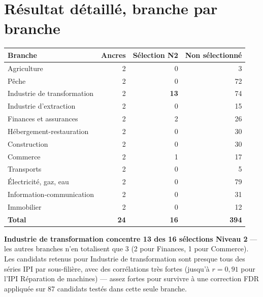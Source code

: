 \documentclass[11pt,a4paper]{article}
\begin{document}
\section{Résultat détaillé, branche par branche}

\begin{fichebox}
\begin{center}
\small
\begin{tabular}{lrrr}
\toprule
\textbf{Branche} & \textbf{Ancres} & \textbf{Sélection N2} & \textbf{Non sélectionné} \\
\midrule
Agriculture & 2 & 0 & 3 \\
Pêche & 2 & 0 & 72 \\
Industrie de transformation & 2 & \textbf{13} & 74 \\
Industrie d'extraction & 2 & 0 & 15 \\
Finances et assurances & 2 & 2 & 26 \\
Hébergement-restauration & 2 & 0 & 30 \\
Construction & 2 & 0 & 30 \\
Commerce & 2 & 1 & 17 \\
Transports & 2 & 0 & 5 \\
Électricité, gaz, eau & 2 & 0 & 79 \\
Information-communication & 2 & 0 & 31 \\
Immobilier & 2 & 0 & 12 \\
\midrule
\textbf{Total} & \textbf{24} & \textbf{16} & \textbf{394} \\
\bottomrule
\end{tabular}
\end{center}
\end{fichebox}

\begin{alertebox}
\textbf{Industrie de transformation concentre 13 des 16 sélections Niveau 2} --- les autres branches n'en totalisent que 3 (2 pour Finances, 1 pour Commerce). Les candidats retenus pour Industrie de transformation sont presque tous des séries IPI par sous-filière, avec des corrélations très fortes (jusqu'à $r=0{,}91$ pour l'IPI Réparation de machines) --- assez fortes pour survivre à une correction FDR appliquée sur 87 candidats testés dans cette seule branche.
\end{alertebox}

\end{document}
